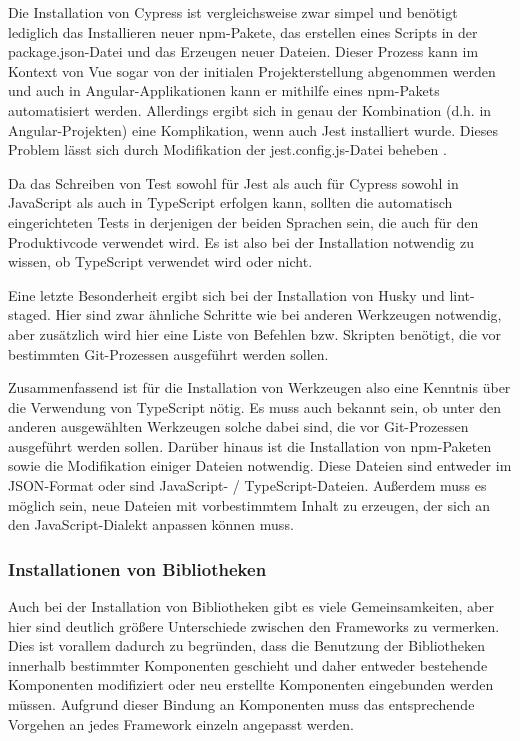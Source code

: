 Die Installation von Cypress ist vergleichsweise zwar simpel und benötigt lediglich das Installieren neuer \gls{npm}-Pakete, das erstellen eines Scripts in der package.json-Datei und das Erzeugen neuer Dateien. Dieser Prozess kann im Kontext von Vue sogar von der initialen Projekterstellung abgenommen werden und auch in Angular-Applikationen kann er mithilfe eines \gls{npm}-Pakets automatisiert werden. Allerdings ergibt sich in genau der Kombination (d.h. in Angular-Projekten) eine Komplikation, wenn auch Jest installiert wurde. Dieses Problem lässt sich durch Modifikation der jest.config.js-Datei beheben \cite{angular_jest_cypress_issue}.

Da das Schreiben von Test sowohl für Jest als auch für Cypress sowohl in JavaScript als auch in TypeScript erfolgen kann, sollten die automatisch eingerichteten Tests in derjenigen der beiden Sprachen sein, die auch für den Produktivcode verwendet wird. Es ist also bei der Installation notwendig zu wissen, ob TypeScript verwendet wird oder nicht.

Eine letzte Besonderheit ergibt sich bei der Installation von Husky und lint-staged. Hier sind zwar ähnliche Schritte wie bei anderen Werkzeugen notwendig, aber zusätzlich wird hier eine Liste von Befehlen bzw. Skripten benötigt, die vor bestimmten Git-Prozessen ausgeführt werden sollen.

Zusammenfassend ist für die Installation von Werkzeugen also eine Kenntnis über die Verwendung von TypeScript nötig. Es muss auch bekannt sein, ob unter den anderen ausgewählten Werkzeugen solche dabei sind, die vor Git-Prozessen ausgeführt werden sollen. Darüber hinaus ist die Installation von \gls{npm}-Paketen sowie die Modifikation einiger Dateien notwendig. Diese Dateien sind entweder im \gls{JSON}-Format oder sind JavaScript- / TypeScript-Dateien. Außerdem muss es möglich sein, neue Dateien mit vorbestimmtem Inhalt zu erzeugen, der sich an den JavaScript-Dialekt anpassen können muss.

\subsubsection{Installationen von Bibliotheken}
Auch bei der Installation von Bibliotheken gibt es viele Gemeinsamkeiten, aber hier sind deutlich größere Unterschiede zwischen den Frameworks zu vermerken. Dies ist vorallem dadurch zu begründen, dass die Benutzung der Bibliotheken innerhalb bestimmter Komponenten geschieht und daher entweder bestehende Komponenten modifiziert oder neu erstellte Komponenten eingebunden werden müssen. Aufgrund dieser Bindung an Komponenten muss das entsprechende Vorgehen an jedes Framework einzeln angepasst werden.

